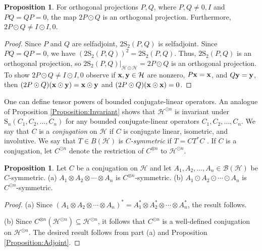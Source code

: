 \documentclass[10pt,reqno]{amsart}
\newcommand{\0}{{\color{lightgray}0}}
\renewcommand{\S}{\mathrm{S}}
\newcommand{\B}{\mathcal{B}}
\newcommand{\h}{\mathcal{H}}
\renewcommand{\vec}[1]{{\bf #1}}
\theoremstyle{definition}
\newtheorem{Proposition}[equation]{Proposition}
\numberwithin{equation}{section}
\begin{document}
\begin{Proposition}\label{compproj}
For orthogonal projections $P, Q$, where $P,Q \neq 0,I$ 
and $PQ = QP = 0$, the map $2P\odot Q$ is an orthogonal projection. Furthermore, $2P\odot Q \neq I \odot I , 0$.
\end{Proposition}
\begin{proof}
Since $P$ and $Q$ are selfadjoint, $2 \S_2 (P,Q)$ is selfadjoint.
Since $P Q = QP = 0$, we have $(2 \S_2 (P,Q))^2 = 2 \S_2 (P,Q)$. Thus, $2 \S_2 (P,Q)$ is an orthogonal projection, so $2 \S_2 (P,Q)|_{\h \odot \h} = 2P\odot Q$ is an orthogonal projection. To show $2P\odot Q \neq I \odot I , 0$ observe if 
$\vec{x},\vec{y} \in \h$ are nonzero, $P\vec{x} = \vec{x}$, and $Q\vec{y} =\vec{y}$, then 
$(2P\odot Q )(\vec{x} \odot \vec{y}) = \vec{x} \odot \vec{y}$ and $(2P\odot Q) (\vec{x} \odot \vec{x}) = 0$.
\end{proof}

One can define tensor powers of bounded conjugate-linear operators.
An analogue of Proposition \ref{Proposition:Invariant} shows that 
$\h^{\odot n}$ is invariant under $\S_n(C_1,C_2,\ldots, C_n)$
for any bounded conjugate-linear operators $C_1, C_2,  \ldots, C_n $. 
We say that $C$ is a \emph{conjugation} on $\h$ if $C$ is conjugate linear,
isometric, and involutive.  We say that $T \in B(\h)$ is \emph{$C$-symmetric} if $T = CT^*C$ \cite{CSO1, CSO2, CSO3}.
If $C$ is a conjugation, let $C^{\odot n}$ 
denote the restriction of $C^{\otimes n}$ to $\h^{\odot n}$.

\begin{Proposition}\label{Csymmetric}
Let $C$ be a conjugation on $\h$ and let $A_1, A_2,  \ldots, A_n \in \B(\h)$ be $C$-symmetric.
(a) $A_1 \otimes A_2 \otimes \cdots \otimes A_n $ is $C^{\otimes n}$-symmetric.
(b) $A_1 \odot A_2 \odot \cdots \odot A_n $ is $C^{\odot n}$-symmetric.
\end{Proposition}

\begin{proof}
(a) Since $(A_1 \otimes A_2 \otimes \cdots \otimes A_n)^* = A_1^* \otimes A_2^* \otimes \cdots \otimes A_n^*$, the result follows.

\medskip\noindent (b) Since $C^{\otimes n} (\h^{\odot n}) \subseteq \h^{\odot n}$, it follows that $C^{\odot n}$ is a well-defined conjugation on $\h^{\odot n}$. The desired result follows from part (a) and Proposition \ref{Proposition:Adjoint}.
\end{proof}


\end{document}
